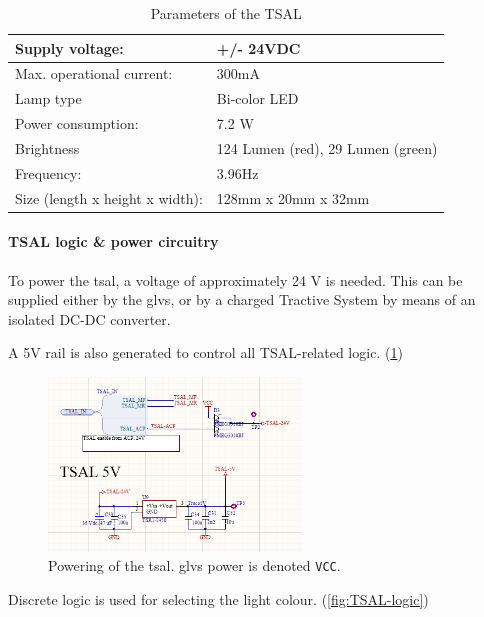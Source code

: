 \begin{table}[H]
	\centering
	\caption{Parameters of the TSAL}
	\begin{tabularx}{\textwidth}{|X|X|}
		\hline
		Supply voltage: & +/- 24VDC \\[\TableSize]
		\hline
		Max. operational current: & 300mA \\[\TableSize]
		\hline
		Lamp type & Bi-color LED \\[\TableSize]
		\hline
		Power consumption: & 7.2 W \\[\TableSize]
		\hline
		Brightness & 124 Lumen (red), 29 Lumen (green) \\[\TableSize]
		\hline
		Frequency: & 3.96Hz \\[\TableSize]
		\hline
		Size (length x height x width): & 128mm x 20mm x 32mm \\[\TableSize]
		\hline
	\end{tabularx}%
	\label{tab:TSAL}%
\end{table}%

\paragraph{TSAL logic \& power circuitry}

To power the \gls{tsal}, a voltage of approximately 24 V is needed. This can be supplied either by the \gls{glvs}, or by a charged Tractive System by means of an isolated DC-DC converter.

A 5V rail is also generated to control all TSAL-related logic. (\ref{fig:TSAL-ECUB-5V})

\begin{figure}[H]
	\centering
	\includegraphics[width=0.6\textwidth]{./img/TSAL-ECUB-5V.png}
	\caption[Powering of the TSAL]{Powering of the \gls{tsal}. \gls{glvs} power is denoted \texttt{VCC}.}
	\label{fig:TSAL-ECUB-5V}
\end{figure}

Discrete logic is used for selecting the light colour. (\ref{fig:TSAL-logic})

